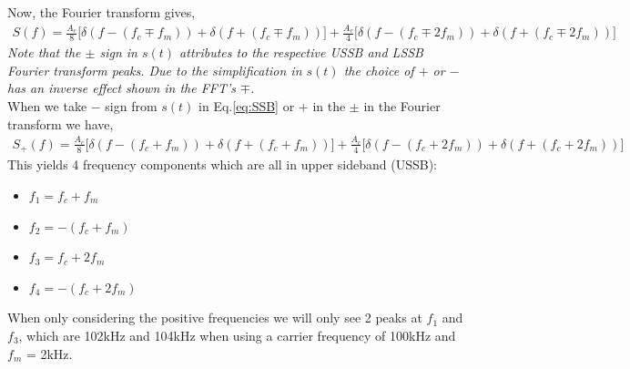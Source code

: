 \documentclass[11pt]{article}
\begin{document}
\begin{enumerate}[label=(\alph*)]
Now, the Fourier transform gives, 
\begin{align*}
    S(f)=\frac{A_c}{8} \bigg[ \delta(f - (f_c \mp f_m)) + \delta(f + (f_c \mp f_m)) \bigg] + \frac{A_c}{4} \bigg[ \delta(f - (f_c \mp 2f_m)) + \delta(f + (f_c \mp 2f_m)) \bigg]
\end{align*}
\textit{Note that the $\pm$ sign in $s(t)$ attributes to the respective USSB and LSSB Fourier transform peaks. Due to the simplification in $s(t)$ the choice of $+$ or $-$ has an inverse effect shown in the FFT's $\mp$.}\\

When we take $-$ sign from $s(t)$ in Eq.\ref{eq:SSB} or $+$ in the $\pm$ in the Fourier transform we have,
\begin{align*}
     S_+(f)=\frac{A_c}{8} \bigg[ \delta(f - (f_c + f_m)) + \delta(f + (f_c + f_m)) \bigg] + \frac{A_c}{4} \bigg[ \delta(f - (f_c + 2f_m)) + \delta(f + (f_c + 2f_m)) \bigg]
\end{align*}
This yields 4 frequency components which are all in upper sideband (USSB):
\begin{multicols}{4}
\begin{itemize}
    \item $f_1=f_c+f_m$
    \item $f_2=-(f_c+f_m)$
    \item $f_3=f_c+2f_m$
    \item $f_4=-(f_c+2f_m)$
\end{itemize}
\end{multicols}
When only considering the positive frequencies we will only see 2 peaks at $f_1$ and $f_3$, which are 102kHz and 104kHz when using a carrier frequency of 100kHz and $f_m$ = 2kHz.


\end{enumerate}
\end{document}
